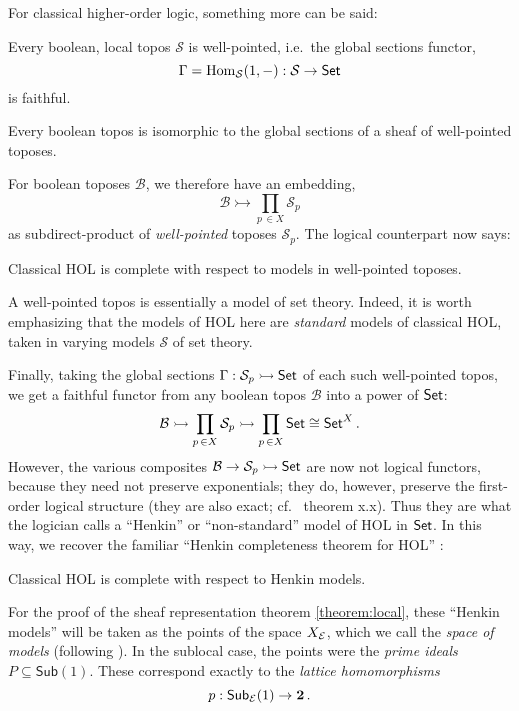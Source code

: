 \documentclass[lambek.tex]{subfiles}
\begin{document}
For classical higher-order logic, something more can be said:

\begin{lemma}
Every boolean, local topos $\mathcal{S}$ is well-pointed, i.e.\ the global sections functor,
\[
\Gamma = \mathrm{Hom}_\mathcal{S}(1, - ) : \mathcal{S} \to \mathsf{Set}
\]
is faithful.
\end{lemma}

\begin{corollary}
Every boolean topos is isomorphic to the global sections of a sheaf of well-pointed toposes.  
\end{corollary}

For boolean toposes $\mathcal{B}$, we therefore have an embedding, 
\[
\mathcal{B} \rightarrowtail \prod_{p\,\in X}\mathcal{S}_p 
\]
as subdirect-product of \emph{well-pointed} toposes $\mathcal{S}_p$.  The logical counterpart now says:
%
\begin{corollary}
Classical HOL is complete with respect to models in well-pointed toposes.
\end{corollary}
\medskip
A well-pointed topos is essentially a model of set theory.  Indeed, it is worth emphasizing that the models of HOL here are \emph{standard} models of classical HOL, taken in varying models $\mathcal{S}$ of set theory.

Finally, taking the global sections $\Gamma:\mathcal{S}_p \rightarrowtail \mathsf{Set}$ of each such well-pointed topos, we get a faithful functor from any boolean topos $\mathcal{B}$ into a power of $\mathsf{Set}$:
\[
\mathcal{B} \rightarrowtail \prod_{p\,\in X}\mathcal{S}_p \rightarrowtail \prod_{p\,\in X}\mathsf{Set} \cong \mathsf{Set}^X\,.
\]
However, the various composites $\mathcal{B} \rightarrow \mathcal{S}_p \rightarrowtail \mathsf{Set}$ are now not logical functors, because they need not preserve exponentials; they do, however, preserve the first-order logical structure (they are also exact; cf.~\cite{Freyd} theorem x.x).  Thus they are what the logician calls a ``Henkin'' or ``non-standard'' model of HOL in $\mathsf{Set}$.  In this way, we recover the familiar ``Henkin completeness theorem for HOL'' \cite{Henkin}:

\begin{corollary}
Classical HOL is complete with respect to Henkin models.
\end{corollary}

For the proof of the sheaf representation theorem \ref{theorem:local}, these ``Henkin models'' will be taken as the points of the space $X_{\mathcal{E}}$, which we call the \emph{space of models} (following \cite{ButzMoerdijk}).
In the  sublocal case, the points were the \emph{prime ideals} $P\subseteq\mathsf{Sub}(1)$.
These correspond exactly to the \emph{lattice homomorphisms} $$p: \mathsf{Sub}_{\mathcal{E}}(1)\to \mathbf{2}\,.$$
\end{document}

